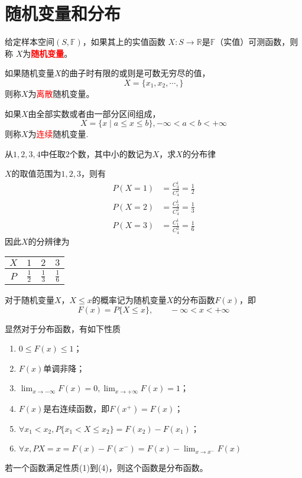 \section{随机变量和分布}
给定样本空间$(S,\mathbb{F})$，如果其上的实值函数 $X:S\to \mathbb {R}$是$\mathbb{F}$（实值）可测函数，则称
$X$为\textcolor{red}{\textbf{\textsf{随机变量}}}。

如果随机变量$X$的曲子时有限的或则是可数无穷尽的值，
\[ X=\{ x_1,x_2,\cdots, \} \]
则称$X$为\textcolor{red}{离散}随机变量。

如果$X$由全部实数或者由一部分区间组成，
\[ X=\{ x\mid a\leq x\leq b \}, -\infty <a<b< +\infty\]
则称$X$为\textcolor{red}{连续}随机变量.


\begin{example}
    从$1,2,3,4$中任取$2$个数，其中小的数记为$X$，求$X$的分布律
\end{example}
\begin{solution}
    $X$的取值范围为${1,2,3}$，则有
    \begin{align*}
        P(X=1) & = \frac{C_3^1}{C_4^2} = \frac{1}{2} \\
        P(X=2) & = \frac{C_2^1}{C_4^2} = \frac{1}{3} \\
        P(X=3) & = \frac{C_1^1}{C_4^2} = \frac{1}{6}
    \end{align*}
    因此$X$的分辨律为
    \begin{center}
        \begin{tabular}{c|ccc}
            $X$ & $1$           & $2$           & $3$           \\ \hline
            $P$ & $\frac{1}{2}$ & $\frac{1}{3}$ & $\frac{1}{6}$
        \end{tabular}
    \end{center}
\end{solution}

\begin{definition}
    对于随机变量$X$，$X\leq x$的概率记为随机变量$X$的分布函数$F(x)$，即
    \[ F(x) = P\{X \leq x\},\qquad -\infty < x < +\infty \]
\end{definition}
显然对于分布函数，有如下性质
\begin{enumerate}[(1)]
    \item $ 0\leq F(x) \leq 1 $；
    \item $ F(x) $单调非降；
    \item $ \lim_{x\to -\infty} F(x) = 0, \lim_{x\to +\infty}F(x) = 1 $；
    \item $F(x)$是右连续函数，即$F(x^+) = F(x)$；
    \item $\forall x_1<x_2, P\{x_1<X\leq x_2\} = F(x_2) - F(x_1)$；
    \item $\forall x, P{X=x} = F(x)-F(x^-) = F(x) - \lim_{x\to x^-} F(x)$
\end{enumerate}
若一个函数满足性质(1)到(4)，则这个函数是分布函数。

